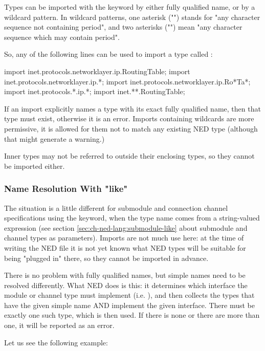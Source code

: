 Types can be imported with the  keyword by either
fully qualified name, or by a wildcard pattern. In wildcard patterns,
one asterisk ("\ttt{*}") stands for "any character sequence not containing
period", and two asterisks ("\ttt{**}") mean "any character sequence which may
contain period".

So, any of the following lines can be used to import a type called
:

\begin{ned}
import inet.protocols.networklayer.ip.RoutingTable;
import inet.protocols.networklayer.ip.*;
import inet.protocols.networklayer.ip.Ro*Ta*;
import inet.protocols.*.ip.*;
import inet.**.RoutingTable;
\end{ned}

If an import explicitly names a type with its exact fully qualified name,
then that type must exist, otherwise it is an error. Imports containing
wildcards are more permissive, it is allowed for them not to match any
existing NED type (although that might generate a warning.)

Inner types may not be referred to outside their enclosing types, so they
cannot be imported either.


\subsubsection{Name Resolution With "like"}

The situation is a little different for submodule and connection channel
specifications using the  keyword, when the type name comes
from a string-valued expression (see section
\ref{sec:ch-ned-lang:submodule-like} about submodule and channel types as
parameters). Imports are not much use here: at the time of writing the NED
file it is not yet known what NED types will be suitable for being "plugged
in" there, so they cannot be imported in advance.

There is no problem with fully qualified names, but simple names need
to be resolved differently. What NED does is this: it determines which
interface the module or channel type must implement (i.e. ),
and then collects the types that have the given simple name AND implement
the given interface. There must be exactly one such type, which is then used.
If there is none or there are more than one, it will be reported as an error.

Let us see the following example:


